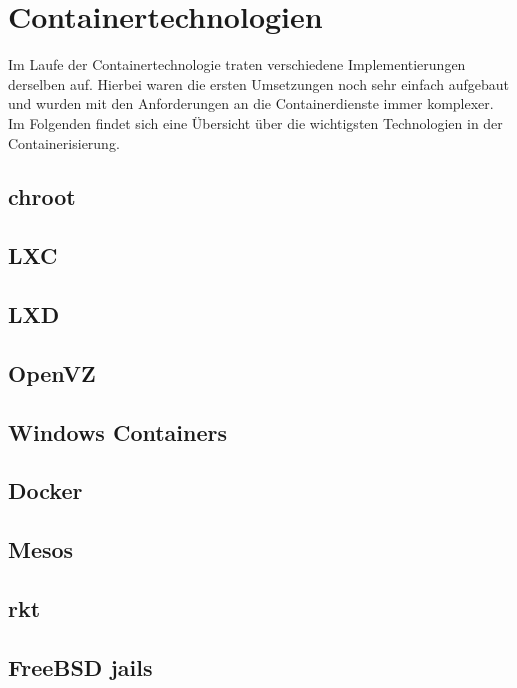 \section{Containertechnologien} 
\label{sec:Containertechnologien}

Im Laufe der  Containertechnologie traten verschiedene Implementierungen derselben auf. Hierbei waren die ersten Umsetzungen noch sehr einfach aufgebaut und wurden mit den Anforderungen an die Containerdienste immer komplexer. Im Folgenden findet sich eine Übersicht über die wichtigsten Technologien in der Containerisierung.

\subsection{chroot}
\label{sec:chroot}

\subsection{LXC}
\label{sec:lxc}

\subsection{LXD}
\label{sec:lxd}

\subsection{OpenVZ}
\label{sec:OpenVZ}

\subsection{Windows Containers}
\label{sec:WindowsContainers}

\subsection{Docker}
\label{sec:Docker}

\subsection{Mesos}
\label{sec:Mesos}

\subsection{rkt}
\label{sec:rkt}

\subsection{FreeBSD jails}
\label{sec:jails}

